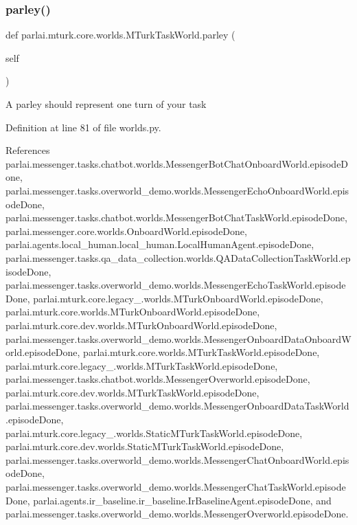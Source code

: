 \subsubsection{\texorpdfstring{parley()}{parley()}}
{\footnotesize\ttfamily def parlai.\+mturk.\+core.\+worlds.\+M\+Turk\+Task\+World.\+parley (\begin{DoxyParamCaption}\item[{}]{self }\end{DoxyParamCaption})}

\begin{DoxyVerb}A parley should represent one turn of your task\end{DoxyVerb}
 

Definition at line 81 of file worlds.\+py.



References parlai.\+messenger.\+tasks.\+chatbot.\+worlds.\+Messenger\+Bot\+Chat\+Onboard\+World.\+episode\+Done, parlai.\+messenger.\+tasks.\+overworld\+\_\+demo.\+worlds.\+Messenger\+Echo\+Onboard\+World.\+episode\+Done, parlai.\+messenger.\+tasks.\+chatbot.\+worlds.\+Messenger\+Bot\+Chat\+Task\+World.\+episode\+Done, parlai.\+messenger.\+core.\+worlds.\+Onboard\+World.\+episode\+Done, parlai.\+agents.\+local\+\_\+human.\+local\+\_\+human.\+Local\+Human\+Agent.\+episode\+Done, parlai.\+messenger.\+tasks.\+qa\+\_\+data\+\_\+collection.\+worlds.\+Q\+A\+Data\+Collection\+Task\+World.\+episode\+Done, parlai.\+messenger.\+tasks.\+overworld\+\_\+demo.\+worlds.\+Messenger\+Echo\+Task\+World.\+episode\+Done, parlai.\+mturk.\+core.\+legacy\+\_.\+worlds.\+M\+Turk\+Onboard\+World.\+episode\+Done, parlai.\+mturk.\+core.\+worlds.\+M\+Turk\+Onboard\+World.\+episode\+Done, parlai.\+mturk.\+core.\+dev.\+worlds.\+M\+Turk\+Onboard\+World.\+episode\+Done, parlai.\+messenger.\+tasks.\+overworld\+\_\+demo.\+worlds.\+Messenger\+Onboard\+Data\+Onboard\+World.\+episode\+Done, parlai.\+mturk.\+core.\+worlds.\+M\+Turk\+Task\+World.\+episode\+Done, parlai.\+mturk.\+core.\+legacy\+\_.\+worlds.\+M\+Turk\+Task\+World.\+episode\+Done, parlai.\+messenger.\+tasks.\+chatbot.\+worlds.\+Messenger\+Overworld.\+episode\+Done, parlai.\+mturk.\+core.\+dev.\+worlds.\+M\+Turk\+Task\+World.\+episode\+Done, parlai.\+messenger.\+tasks.\+overworld\+\_\+demo.\+worlds.\+Messenger\+Onboard\+Data\+Task\+World.\+episode\+Done, parlai.\+mturk.\+core.\+legacy\+\_.\+worlds.\+Static\+M\+Turk\+Task\+World.\+episode\+Done, parlai.\+mturk.\+core.\+dev.\+worlds.\+Static\+M\+Turk\+Task\+World.\+episode\+Done, parlai.\+messenger.\+tasks.\+overworld\+\_\+demo.\+worlds.\+Messenger\+Chat\+Onboard\+World.\+episode\+Done, parlai.\+messenger.\+tasks.\+overworld\+\_\+demo.\+worlds.\+Messenger\+Chat\+Task\+World.\+episode\+Done, parlai.\+agents.\+ir\+\_\+baseline.\+ir\+\_\+baseline.\+Ir\+Baseline\+Agent.\+episode\+Done, and parlai.\+messenger.\+tasks.\+overworld\+\_\+demo.\+worlds.\+Messenger\+Overworld.\+episode\+Done.

